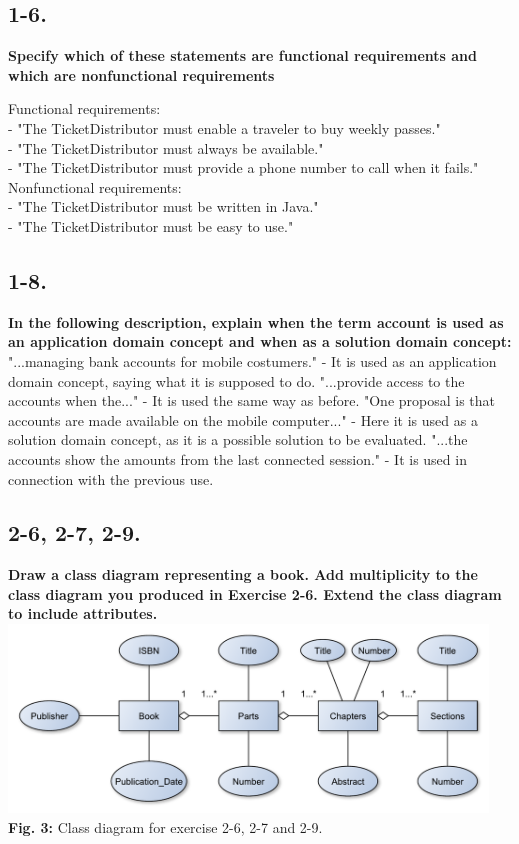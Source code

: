 \documentclass[12pt]{article}
\begin{document}
\subsection{1-6.}
\textbf{Specify which of these statements are functional requirements and which are
nonfunctional requirements}

Functional requirements:\\
- "The TicketDistributor must enable a traveler to buy weekly passes."\\
- "The TicketDistributor must always be available."\\
- "The TicketDistributor must provide a phone number to call when it fails."\\

Nonfunctional requirements:\\
- "The TicketDistributor must be written in Java."\\
- "The TicketDistributor must be easy to use."\\



\subsection{1-8.}
\textbf{In the following description, explain when the term account is used as an application domain concept and when as a solution domain concept:}\\
"...managing bank accounts for mobile costumers." - It is used as an application domain concept, saying what it is supposed to do. 
"...provide access to the accounts when the..." - It is used the same way as before. 
"One proposal is that accounts are made available on the mobile computer..." - Here it is used as a solution domain concept, as it is a possible solution to be evaluated. 
"...the accounts show the amounts from the last connected session." - It is used in connection with the previous use.\\



\subsection{2-6, 2-7, 2-9.}
\textbf{Draw a class diagram representing a book. Add multiplicity to the class diagram you produced in Exercise 2-6. Extend the class diagram to include attributes.}\\

\includegraphics[height=50mm]{2-6}\\
\textbf{Fig. 3:} Class diagram for exercise 2-6, 2-7 and 2-9.
\end{document}
